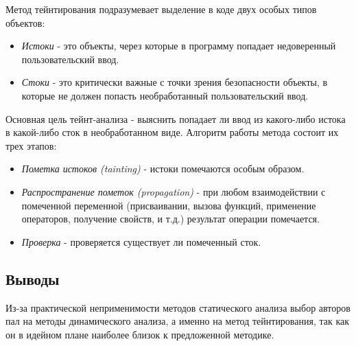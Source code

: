 	Метод тейнтирования подразумевает выделение в коде двух особых типов объектов:
	\begin{itemize}
		\item \textit{Истоки} - это объекты, через которые в программу попадает недоверенный пользовательский ввод.
		\item \textit{Стоки} - это критически важные с точки зрения безопасности объекты, в которые не должен попасть необработанный пользовательский ввод.
	\end{itemize}

	Основная цель тейнт-анализа - выяснить попадает ли ввод из какого-либо истока в какой-либо сток в необработанном виде. Алгоритм работы метода состоит их трех этапов:

	\begin{itemize}
		\item \textit{Пометка истоков (tainting)} - истоки помечаются особым образом.
		\item \textit{Распространение пометок (propagation)} - при любом взаимодействии с помеченной переменной (присваивании, вызова функций, применение операторов, получение свойств, и т.д.) результат операции помечается.
		\item \textit{Проверка} - проверяется существует ли помеченный сток.
	\end{itemize}


\subsection{Выводы}
	Из-за практической неприменимости методов статического анализа выбор авторов пал на методы динамического анализа, а именно на метод тейнтирования, так как он в идейном плане наиболее близок к предложенной методике.






